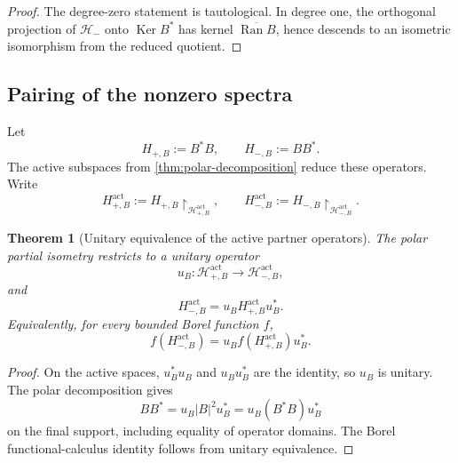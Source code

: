 \documentclass[11pt,reqno]{scrartcl}
\newcommand{\scrHm}{\mathscr H_{-}}
\DeclareMathOperator{\Ran}{Ran}
\DeclareMathOperator{\Ker}{Ker}
\newcommand{\restr}[2]{#1\!\upharpoonright_{#2}}
\theoremstyle{plain}
\newtheorem{theorem}{Theorem}[section]
\theoremstyle{definition}
\theoremstyle{remark}
\begin{document}
\begin{proof}
The degree-zero statement is tautological.  In degree one, the orthogonal
projection of \(\scrHm\) onto \(\Ker B^*\) has kernel
\(\overline{\Ran B}\), hence descends to an isometric isomorphism from the
reduced quotient.
\end{proof}

\subsection{Pairing of the nonzero spectra}

Let
\begin{equation}
  H_{+,B}:=B^*B,
  \qquad
  H_{-,B}:=BB^*.
  \label{eq:partner-H}
\end{equation}
The active subspaces from \cref{thm:polar-decomposition} reduce these
operators.  Write
\begin{equation}
  H_{+,B}^{\mathrm{act}}
  :=\restr{H_{+,B}}{\mathscr H_{+,B}^{\mathrm{act}}},
  \qquad
  H_{-,B}^{\mathrm{act}}
  :=\restr{H_{-,B}}{\mathscr H_{-,B}^{\mathrm{act}}}.
\end{equation}

\begin{theorem}[Unitary equivalence of the active partner operators]
\label{thm:partner-unitary-equivalence}
The polar partial isometry restricts to a unitary operator
\begin{equation}
  u_B:\mathscr H_{+,B}^{\mathrm{act}}
  \longrightarrow
  \mathscr H_{-,B}^{\mathrm{act}},
\end{equation}
and
\begin{equation}
  \boxed{
  H_{-,B}^{\mathrm{act}}
  =u_B H_{+,B}^{\mathrm{act}}u_B^*.}
  \label{eq:partner-unitary}
\end{equation}
Equivalently, for every bounded Borel function \(f\),
\begin{equation}
  f(H_{-,B}^{\mathrm{act}})
  =u_B f(H_{+,B}^{\mathrm{act}})u_B^*.
  \label{eq:partner-functional-calculus}
\end{equation}
\end{theorem}

\begin{proof}
On the active spaces, \(u_B^*u_B\) and \(u_Bu_B^*\) are the identity, so
\(u_B\) is unitary.  The polar decomposition gives
\begin{equation}
  BB^*=u_B|B|^2u_B^*=u_B(B^*B)u_B^*
\end{equation}
on the final support, including equality of operator domains.  The Borel
functional-calculus identity follows from unitary equivalence.
\end{proof}
\end{document}
